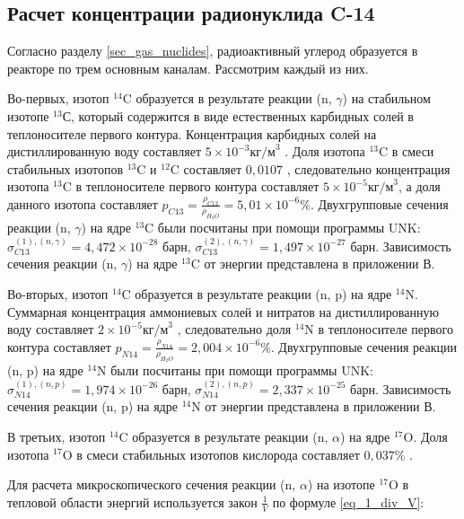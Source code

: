 \subsection{Расчет концентрации радионуклида C-14}

Согласно разделу \ref{sec_gas_nuclides}, радиоактивный углерод образуется в реакторе по трем основным каналам. 
Рассмотрим каждый из них.

Во-первых, изотоп $^{14}\text{C}$ образуется в результате реакции (n, $\gamma$) на стабильном изотопе $^{13}\text{С}$, 
который содержится в виде естественных карбидных солей в теплоносителе первого контура. Концентрация карбидных солей на 
дистиллированную воду составляет $5 \times 10^{-3} \text{кг/м}^{3}$ \cite{gost_water}. Доля изотопа $^{13}\text{C}$ в 
смеси стабильных изотопов $^{13}\text{C}$ и $^{12}\text{C}$ составляет $0,0107$ \cite{audi_carbid_sald}, следовательно 
концентрация изотопа $^{13}\text{C}$ в теплоносителе первого контура составляет $5 \times 10^{-5} \text{кг/м}^{3}$, а 
доля данного изотопа составляет $p_{C13} = \frac{\rho_{C13}}{\rho_{H_{2}O}} = 5,01 \times 10^{-6} \%$. Двухгрупповые 
сечения реакции (n, $\gamma$) на ядре $^{13}\text{C}$ были посчитаны при помощи программы UNK:
$\sigma_{C13}^{(1), (n, \gamma)} = 4,472 \times 10^{-28}$ барн, 
$\sigma_{C13}^{(2), (n, \gamma)} = 1,497 \times 10^{-27}$ барн.
Зависимость сечения реакции (n, $\gamma$) на ядре $^{13}\text{C}$ от энергии представлена в приложении В. 

Во-вторых, изотоп $^{14}\text{C}$ образуется в результате реакции (n, p) на ядре $^{14}\text{N}$. Суммарная концентрация 
аммониевых солей и нитратов на дистиллированную воду составляет $2 \times 10^{-5} \text{кг/м}^{3}$ \cite{gost_water}, 
следовательно доля $^{14}\text{N}$ в теплоносителе первого контура составляет 
$p_{N14} = \frac{\rho_{N14}}{\rho_{H_{2}O}} = 2,004 \times 10^{-6} \%$. Двухгрупповые сечения реакции (n, p) на ядре 
$^{14}\text{N}$ были посчитаны при помощи программы UNK:
$\sigma_{N14}^{(1), (n, p)} = 1,974 \times 10^{-26}$ барн, 
$\sigma_{N14}^{(2), (n, p)} = 2,337 \times 10^{-25}$ барн.
Зависимость сечения реакции (n, p) на ядре $^{14}\text{N}$ от энергии представлена в приложении В.

В третьих, изотоп $^{14}\text{C}$ образуется в результате реакции (n, $\alpha$) на ядре $^{17}\text{O}$. Доля изотопа 
$^{17}\text{O}$ в смеси стабильных изотопов кислорода составляет $0,037 \%$ \cite{hoefs_oxygen_isotopes}.

Для расчета микроскопического сечения реакции (n, $\alpha$) на изотопе $^{17}\text{O}$ в тепловой области энергий 
используется закон $\frac{1}{V}$ по формуле \ref{eq_1_div_V}:

